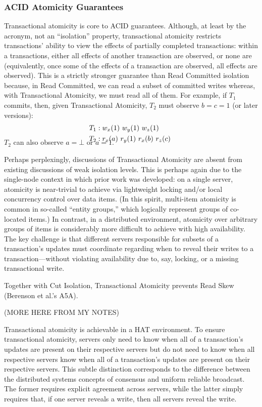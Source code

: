 \subsubsection{ACID Atomicity Guarantees}

Transactional atomicity is core to ACID guarantees. Although, at least
by the acronym, not an ``isolation'' property, transactional atomicity
restricts transactions' ability to view the effects of partially
completed transactions: within a transactions, either all effects of
another transaction are observed, or none are (equivalently, once some
of the effects of a transaction are observed, all effects are
observed). This is a strictly stronger guarantee than Read Committed
isolation because, in Read Committed, we can read a subset of
committed writes whereas, with Transactional Atomicity, we must read
all of them. For example, if $T_1$ commits, then, given Transactional
Atomicity, $T_2$ must observe $b=c=1$ (or later versions):
\vspace{-.5em}
\begin{align*}
\small
T_1 &: w_x(1)~w_y(1)~w_z(1)
\\T_2 &: r_x(a)~r_y(1)~r_x(b)~r_z(c)~\\[-1.5em]
\end{align*}
$T_2$ can also observe $a=\bot$ or $a=1$.

Perhaps perplexingly, discussions of Transactional Atomicity are
absent from existing discussions of weak isolation levels. This is
perhaps again due to the single-node context in which prior work was
developed: on a single server, atomicity is near-trivial to achieve
via lightweight locking and/or local concurrency control over data
items. (In this spirit, multi-item atomicity is common in so-called
``entity groups,'' which logically represent groups of co-located
items.) In contrast, in a distributed environment, atomicity over
arbitrary groups of items is considerably more difficult to achieve
with high availability. The key challenge is that different servers
responsible for subsets of a transaction's updates must coordinate
regarding when to reveal their writes to a transaction---without
violating availability due to, say, locking, or a missing
transactional write.

Together with Cut Isolation, Transactional Atomicity prevents Read
Skew (Berenson et al.'s A5A).

(MORE HERE FROM MY NOTES)

Transactional atomicity is achievable in a HAT environment. To ensure
transactional atomicity, servers only need to know when all of a
transaction's updates are present on their respective servers but do
not need to know when all respective servers know when all of a
transaction's updates are present on their respective servers. This
subtle distinction corresponds to the difference between the
distributed systems concepts of consensus and uniform reliable
broadcast. The former requires explicit agreement across servers,
while the latter simply requires that, if one server reveals a write,
then all servers reveal the write.

